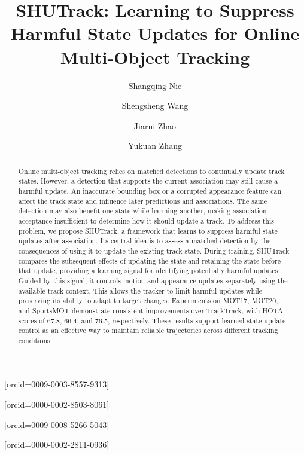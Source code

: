\documentclass[a4paper,fleqn]{cas-sc}
\begin{document}
\let\WriteBookmarks\relax
\def\floatpagepagefraction{1}
\def\textpagefraction{.001}


\title[mode=title]{SHUTrack: Learning to Suppress Harmful State Updates for Online Multi-Object Tracking}

\author[1,3]{Shangqing Nie}[orcid=0009-0003-8557-9313]

\author[1,2,3]{Shengsheng Wang}[orcid=0000-0002-8503-8061]

\author[1,3]{Jiarui Zhao}[orcid=0009-0008-5266-5043]

\author[2,3]{Yukuan Zhang}[orcid=0000-0002-2811-0936]
\cormark[1]

\address[1]{College of Software, Jilin University, Changchun 130012, China}
\address[2]{College of Computer Science and Technology, Jilin University, Changchun 130012, China}
\address[3]{Key Laboratory of Symbolic Computation and Knowledge Engineering of Ministry of Education, Jilin University, Changchun 130012, China}


\begin{abstract}
Online multi-object tracking relies on matched detections to continually update track states. However, a detection that supports the current association may still cause a harmful update. An inaccurate bounding box or a corrupted appearance feature can affect the track state and influence later predictions and associations. The same detection may also benefit one state while harming another, making association acceptance insufficient to determine how it should update a track. To address this problem, we propose SHUTrack, a framework that learns to suppress harmful state updates after association. Its central idea is to assess a matched detection by the consequences of using it to update the existing track state. During training, SHUTrack compares the subsequent effects of updating the state and retaining the state before that update, providing a learning signal for identifying potentially harmful updates. Guided by this signal, it controls motion and appearance updates separately using the available track context. This allows the tracker to limit harmful updates while preserving its ability to adapt to target changes. Experiments on MOT17, MOT20, and SportsMOT demonstrate consistent improvements over TrackTrack, with HOTA scores of 67.8, 66.4, and 76.5, respectively. These results support learned state-update control as an effective way to maintain reliable trajectories across different tracking conditions.
\end{abstract}
\end{document}
